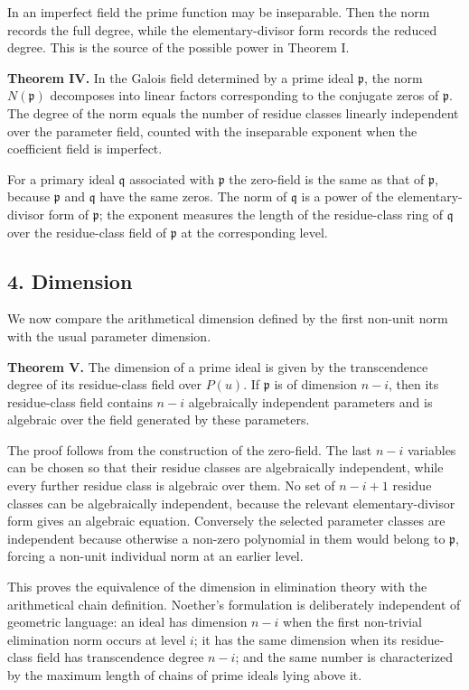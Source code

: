 \documentclass[11pt]{article}
\begin{document}
In an imperfect field the prime function may be inseparable. Then the norm records the full degree, while the elementary-divisor form records the reduced degree. This is the source of the possible power in Theorem I.

\textbf{Theorem IV.} In the Galois field determined by a prime ideal $\mathfrak p$, the norm $N(\mathfrak p)$ decomposes into linear factors corresponding to the conjugate zeros of $\mathfrak p$. The degree of the norm equals the number of residue classes linearly independent over the parameter field, counted with the inseparable exponent when the coefficient field is imperfect.

For a primary ideal $\mathfrak q$ associated with $\mathfrak p$ the zero-field is the same as that of $\mathfrak p$, because $\mathfrak p$ and $\mathfrak q$ have the same zeros. The norm of $\mathfrak q$ is a power of the elementary-divisor form of $\mathfrak p$; the exponent measures the length of the residue-class ring of $\mathfrak q$ over the residue-class field of $\mathfrak p$ at the corresponding level.

\subsection{4. Dimension}

We now compare the arithmetical dimension defined by the first non-unit norm with the usual parameter dimension.

\textbf{Theorem V.} The dimension of a prime ideal is given by the transcendence degree of its residue-class field over $P(u)$. If $\mathfrak p$ is of dimension $n-i$, then its residue-class field contains $n-i$ algebraically independent parameters and is algebraic over the field generated by these parameters.

The proof follows from the construction of the zero-field. The last $n-i$ variables can be chosen so that their residue classes are algebraically independent, while every further residue class is algebraic over them. No set of $n-i+1$ residue classes can be algebraically independent, because the relevant elementary-divisor form gives an algebraic equation. Conversely the selected parameter classes are independent because otherwise a non-zero polynomial in them would belong to $\mathfrak p$, forcing a non-unit individual norm at an earlier level.

This proves the equivalence of the dimension in elimination theory with the arithmetical chain definition. Noether's formulation is deliberately independent of geometric language: an ideal has dimension $n-i$ when the first non-trivial elimination norm occurs at level $i$; it has the same dimension when its residue-class field has transcendence degree $n-i$; and the same number is characterized by the maximum length of chains of prime ideals lying above it.
\end{document}
